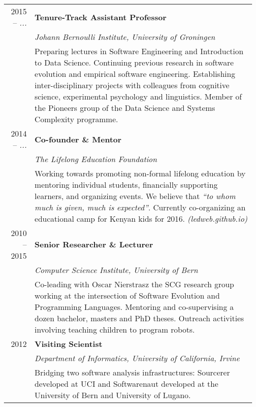 
\newcommand{\job}[4]
	{#1 & %

	{\bf #3}\\ & %

	{\em #2} \vspace{0.2em} \\ & %


	{#4} \vspace{1em} \\} %

\begin{tabular}{r p{12cm}}

	\job
	{2015 -- {\em ...}}
	{Johann Bernoulli Institute, University of Groningen}
	{Tenure-Track Assistant Professor}
	{Preparing lectures in Software Engineering and Introduction to Data Science. Continuing previous research in software evolution and empirical software engineering. Establishing inter-disciplinary projects with colleagues from cognitive science, experimental psychology and linguistics. Member of the Pioneers group of the Data Science and Systems Complexity programme.}

	\job
	{2014 -- {\em ...}}
	{The Lifelong Education Foundation }
	{Co-founder \& Mentor}
	{Working towards promoting non-formal lifelong education by mentoring individual students, financially supporting learners, and organizing events. We believe that {\em ``to whom much is given, much is expected''}. Currently co-organizing an educational camp for Kenyan kids for 2016. {\em (ledweb.github.io)}}


	\job
	{2010 -- 2015}
	{Computer Science Institute, University of Bern}
	{Senior Researcher \& Lecturer}
	{
	Co-leading with Oscar Nierstrasz the SCG research group working at the intersection of Software Evolution and Programming Languages. Mentoring and co-supervising a dozen bachelor, masters and PhD theses. Outreach activities involving teaching children to program robots.}

	\job
	{2012}
	{Department of Informatics, University of California, Irvine}
	{Visiting Scientist}
	{
	Bridging two software analysis infrastructures: Sourcerer developed at UCI and Softwarenaut developed at the University of Bern and University of Lugano. 
	}



\end{tabular}
